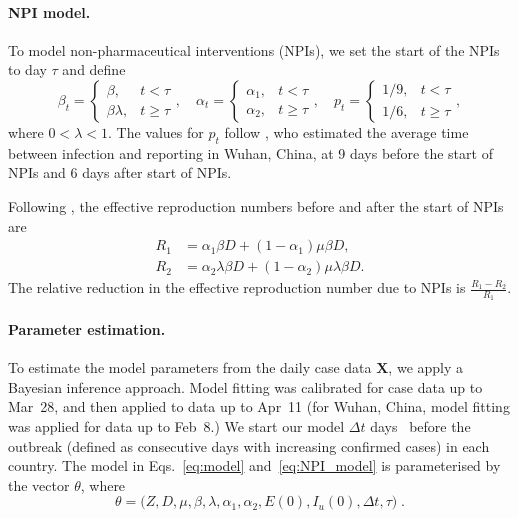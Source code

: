 \documentclass[12pt]{extarticle}
\let\vec\mathbf
\begin{document}
{\paragraph*{NPI model.}
To model non-pharmaceutical interventions (NPIs), we set the start of the NPIs to day $\tau$ and define
\begin{equation} \label{eq:NPI_model}
\beta_t = \begin{cases} 
  \beta, & t < \tau \\ 
  \beta \lambda, & t \ge \tau
\end{cases},
\quad
\alpha_t = \begin{cases} 
  \alpha_1, & t < \tau \\ 
  \alpha_2, & t \ge \tau
\end{cases},
\quad
p_t = \begin{cases} 
  1/9, & t < \tau \\ 
  1/6, & t \ge \tau
\end{cases},
\end{equation}
where $0 < \lambda < 1$.
The values for $p_t$ follow \citet{Li2020}, who estimated the average time between infection and reporting in Wuhan, China, at 9 days before the start of NPIs and 6 days after start of NPIs.

Following \citet{Li2020}, the effective reproduction numbers before and after the start of NPIs are
\begin{equation} \label{eq:Re}
\begin{aligned}
R_1 &= \alpha_1 \beta D + (1-\alpha_1) \mu \beta D, \\
R_2 &= \alpha_2 \lambda \beta D + (1-\alpha_2) \mu \lambda \beta D.
\end{aligned}
\end{equation}
The relative reduction in the effective reproduction number due to NPIs is $\frac{R_1 - R_2}{R_1}$.



\paragraph*{Parameter estimation.}
To estimate the model parameters from the daily case data $\vec{X}$, we apply a Bayesian inference approach.
Model fitting was calibrated for case data up to Mar~28, and then applied to data up to Apr~11 (for Wuhan, China, model fitting was applied for data up to Feb~8.)
We start our model $\Delta t$ days~\citep{Gatto2020} before the outbreak (defined as consecutive days with increasing confirmed cases) in each country.
The model in Eqs.~\ref{eq:model} and~\ref{eq:NPI_model} is parameterised by the vector $\theta$, where
\begin{equation} \label{eq:theta}
\theta=\Big(Z, D, \mu, \beta, \lambda, \alpha_1, \alpha_2, E(0), I_u(0), \Delta t, \tau \Big) \;.
\end{equation} 

}
\end{document}
